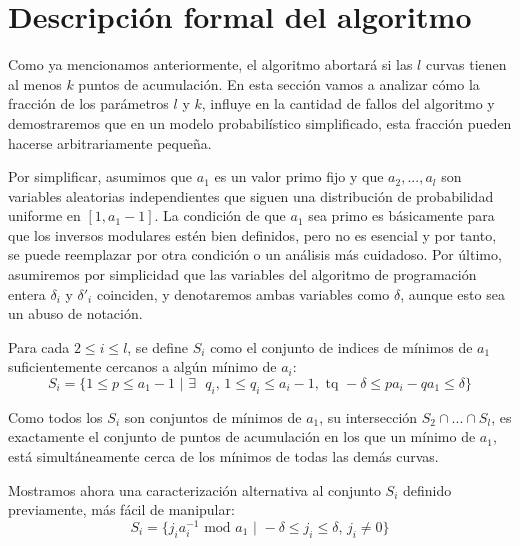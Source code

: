     \section{Descripción formal del algoritmo}

    Como ya mencionamos anteriormente, el algoritmo abortará si las $l$ curvas tienen al menos $k$ puntos de acumulación. En esta sección vamos a analizar cómo la fracción de los parámetros $l$ y $k$, influye en la cantidad de fallos del algoritmo y demostraremos que en un modelo probabilístico simplificado, esta fracción pueden hacerse arbitrariamente pequeña.
    
    Por simplificar, asumimos que $a_{1}$ es un valor primo fijo y que $a_{2}, ... , a_{l}$ son variables aleatorias independientes que siguen una distribución de probabilidad uniforme en $[1, a_{1} - 1]$. La condición de que $a_{1}$ sea primo es básicamente para que los inversos modulares estén bien definidos, pero no es esencial y por tanto, se puede reemplazar por otra condición o un análisis más cuidadoso. Por último, asumiremos por simplicidad que las variables del algoritmo de programación entera $\delta_{i}$ y $\delta'_{i}$ coinciden, y denotaremos ambas variables como $\delta$, aunque esto sea un abuso de notación. 

    \begin{definicion} \cite{artSha}
    Para cada $2 \leq i \leq l$, se define $S_{i}$ como el conjunto de indices de mínimos de $a_{1}$ suficientemente cercanos a algún mínimo de $a_{i}$:
        \begin{equation}
            S_{i} = \{1 \leq p \leq a_{1} - 1 \text{ | }\exists \text{ } q_{i} \text{, } 1 \leq q_{i} \leq a_{i} - 1, \text{ tq } -\delta \leq pa_{i} - qa_{1} \leq \delta\}    
        \end{equation}
    \end{definicion}

    Como todos los $S_{i}$ son conjuntos de mínimos de $a_{1}$, su intersección $S_{2} \cap ... \cap S_{l}$, es exactamente el conjunto de puntos de acumulación en los que un mínimo de $a_{1}$, está simultáneamente cerca de los mínimos de todas las demás curvas.

    \begin{lema} \cite{artSha}
        Mostramos ahora una caracterización alternativa al conjunto $S_{i}$ definido previamente, más fácil de manipular:
        \begin{equation}
            S_{i} = \{j_{i}a_{i}^{-1} \text{ mod } a_{1} \text{ | } -\delta \leq j_{i} \leq \delta \text{, } j_{i} \neq 0\}    
        \end{equation}
    \end{lema}

